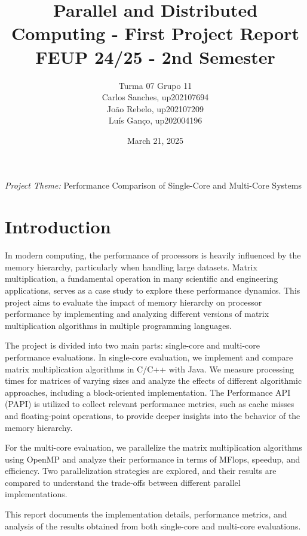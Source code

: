 \documentclass{article}
\title{Parallel and Distributed Computing - First Project Report \\ FEUP 24/25 - 2nd Semester}
\author{
Turma 07 Grupo 11 \\
Carlos Sanches, up202107694 \\
João Rebelo, up202107209 \\
Luís Ganço, up202004196
}
\date{March 21, 2025}
\begin{document}
\newpage 
\vspace{0.in}

\maketitle
\begin{center}
    \large \textit{Project Theme:} Performance Comparison of Single-Core and Multi-Core Systems
\end{center}
\vspace{1.3in}
\tableofcontents
\newpage %

\section{Introduction}

In modern computing, the performance of processors is heavily influenced by the memory hierarchy, particularly when handling large datasets. Matrix multiplication, a fundamental operation in many scientific and engineering applications, serves as a case study to explore these performance dynamics. This project aims to evaluate the impact of memory hierarchy on processor performance by implementing and analyzing different versions of matrix multiplication algorithms in multiple programming languages.

The project is divided into two main parts: single-core and multi-core performance evaluations. In single-core evaluation, we implement and compare matrix multiplication algorithms in C/C++ with Java. We measure processing times for matrices of varying sizes and analyze the effects of different algorithmic approaches, including a block-oriented implementation. The Performance API (PAPI) is utilized to collect relevant performance metrics, such as cache misses and floating-point operations, to provide deeper insights into the behavior of the memory hierarchy.

For the multi-core evaluation, we parallelize the matrix multiplication algorithms using OpenMP and analyze their performance in terms of MFlops, speedup, and efficiency. Two parallelization strategies are explored, and their results are compared to understand the trade-offs between different parallel implementations.

This report documents the implementation details, performance metrics, and analysis of the results obtained from both single-core and multi-core evaluations. 
\end{document}
